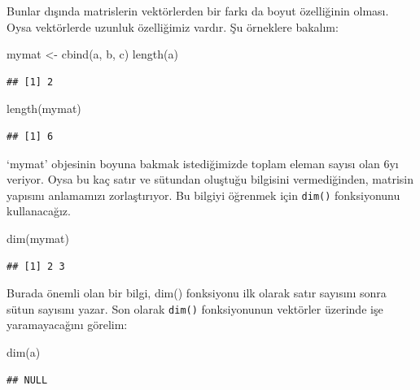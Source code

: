 \documentclass[
]{book}
\newenvironment{Shaded}{\begin{snugshade}}{\end{snugshade}}
\newcommand{\FunctionTok}[1]{\textcolor[rgb]{0.00,0.00,0.00}{#1}}
\newcommand{\NormalTok}[1]{#1}
\newcommand{\OtherTok}[1]{\textcolor[rgb]{0.56,0.35,0.01}{#1}}
\begin{document}
Bunlar dışında matrislerin vektörlerden bir farkı da boyut özelliğinin olması. Oysa vektörlerde uzunluk özelliğimiz vardır. Şu örneklere bakalım:

\begin{Shaded}
\begin{Highlighting}[]
\NormalTok{mymat }\OtherTok{\textless{}{-}} \FunctionTok{cbind}\NormalTok{(a, b, c)}
\FunctionTok{length}\NormalTok{(a)}
\end{Highlighting}
\end{Shaded}

\begin{verbatim}
## [1] 2
\end{verbatim}

\begin{Shaded}
\begin{Highlighting}[]
\FunctionTok{length}\NormalTok{(mymat)}
\end{Highlighting}
\end{Shaded}

\begin{verbatim}
## [1] 6
\end{verbatim}

`mymat' objesinin boyuna bakmak istediğimizde toplam eleman sayısı olan 6yı veriyor. Oysa bu kaç satır ve sütundan oluştuğu bilgisini vermediğinden, matrisin yapısını anlamamızı zorlaştırıyor. Bu bilgiyi öğrenmek için \texttt{dim()} fonksiyonunu kullanacağız.

\begin{Shaded}
\begin{Highlighting}[]
\FunctionTok{dim}\NormalTok{(mymat)}
\end{Highlighting}
\end{Shaded}

\begin{verbatim}
## [1] 2 3
\end{verbatim}

Burada önemli olan bir bilgi, dim() fonksiyonu ilk olarak satır sayısını sonra sütun sayısını yazar. Son olarak \texttt{dim()} fonksiyonunun vektörler üzerinde işe yaramayacağını görelim:

\begin{Shaded}
\begin{Highlighting}[]
\FunctionTok{dim}\NormalTok{(a)}
\end{Highlighting}
\end{Shaded}

\begin{verbatim}
## NULL
\end{verbatim}
\end{document}
